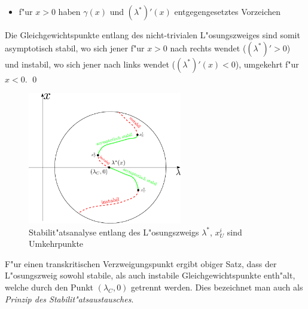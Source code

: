 \documentclass[a4paper, 13pt]{scrreprt}
\theoremstyle{definition} \newtheorem{definition}{Definition}[section]
\newenvironment{beweis}[1][Beweis]{\begin{trivlist}
\item[\hskip \labelsep {\bfseries #1}]}{\end{trivlist}}
\newenvironment{bemerkung}[1][Bemerkung]{\begin{trivlist}
\item[\hskip \labelsep {\bfseries #1}]}{\end{trivlist}}
\begin{document}
\begin{beweis}
\begin{itemize}
\item
f"ur $x>0$ haben $\gamma(x)$ und $(\lambda^*)'(x)$ entgegengesetztes Vorzeichen
\end{itemize}
Die Gleichgewichtspunkte entlang des nicht-trivialen L"osungszweiges sind somit asymptotisch stabil, wo sich jener f"ur $x>0$ nach rechts wendet ($(\lambda^*)'>0$) und instabil, wo sich jener nach links wendet ($(\lambda^*)'(x)<0$), umgekehrt f"ur \(x<0\).
\qed
\end{beweis}
\begin{figure}[htpb]
		\centering
		\includegraphics[width=0.6\textwidth]{img/bifurkation/stab/stab_analyse.pdf}
		\caption{Stabilit"atsanalyse entlang des L"osungszweigs $\lambda^*$, $x_U^i$ sind Umkehrpunkte}
\end{figure}
\begin{bemerkung}
F"ur einen transkritischen Verzweigungspunkt ergibt obiger Satz, dass der L"osungszweig sowohl stabile, als auch instabile Gleichgewichtspunkte enth"alt, welche durch den Punkt $(\lambda_C, 0)$ getrennt werden. Dies bezeichnet man auch als  \emph{Prinzip des Stabilit"atsaustausches}.
\end{bemerkung}
\end{document}
